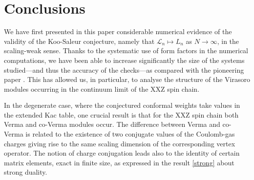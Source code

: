 \documentclass[a4paper,10pt]{article}
\newcommand{\linnea}[1]{$\framebox{\tiny L}$\ \textbf{\texttt{{\color{red}\footnotesize#1}}}}
\newcommand{\jesper}[1]{$\framebox{\tiny J}$\ \textbf{\texttt{{\color{cyan}\footnotesize#1}}}}
\begin{document}









\section{Conclusions}\label{Conclusion}

We have first presented in this paper considerable  numerical evidence of the validity of the Koo-Saleur conjecture, namely that $\mathcal{L}_n \mapsto L_n$ as $N \to \infty$, in the scaling-weak sense. Thanks to the systematic use of form factors in the numerical computations, we have been able to increase significantly the size of the systems studied---and thus the accuracy of the checks---as compared with the pioneering paper \cite{KooSaleur}. This has allowed us, in particular, to analyse the structure of the Virasoro modules occurring in the continuum limit of the XXZ spin chain.%

In the degenerate case, where the conjectured conformal weights take values in the extended Kac table, one crucial result is that for the XXZ spin chain both Verma and co-Verma modules occur. %
The difference between Verma and co-Verma is related to the existence of two conjugate values of the Coulomb-gas charges giving rise to the same scaling dimension of the corresponding vertex operator. The notion of charge conjugation leads also to the identity of certain matrix elements, exact in finite size, as expressed in the result \eqref{strong} about strong duality.
\end{document}
